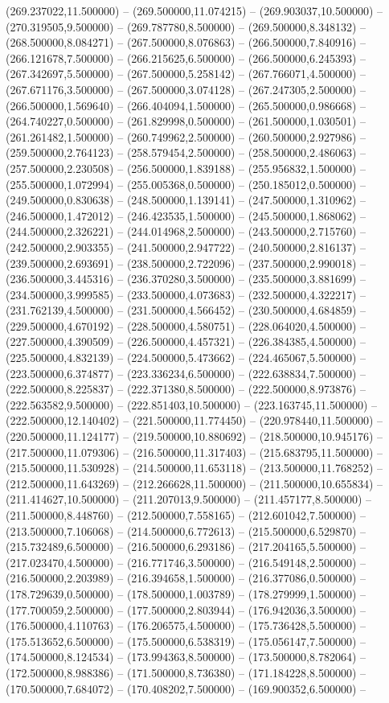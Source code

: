 (269.237022,11.500000) -- (269.500000,11.074215) -- (269.903037,10.500000) -- (270.319505,9.500000) -- (269.787780,8.500000) -- (269.500000,8.348132) -- (268.500000,8.084271) -- (267.500000,8.076863) -- (266.500000,7.840916) -- (266.121678,7.500000) -- (266.215625,6.500000) -- (266.500000,6.245393) -- (267.342697,5.500000) -- (267.500000,5.258142) -- (267.766071,4.500000) -- (267.671176,3.500000) -- (267.500000,3.074128) -- (267.247305,2.500000) -- (266.500000,1.569640) -- (266.404094,1.500000) -- (265.500000,0.986668) -- (264.740227,0.500000) -- (261.829998,0.500000) -- (261.500000,1.030501) -- (261.261482,1.500000) -- (260.749962,2.500000) -- (260.500000,2.927986) -- (259.500000,2.764123) -- (258.579454,2.500000) -- (258.500000,2.486063) -- (257.500000,2.230508) -- (256.500000,1.839188) -- (255.956832,1.500000) -- (255.500000,1.072994) -- (255.005368,0.500000) -- (250.185012,0.500000) -- (249.500000,0.830638) -- (248.500000,1.139141) -- (247.500000,1.310962) -- (246.500000,1.472012) -- (246.423535,1.500000) -- (245.500000,1.868062) -- (244.500000,2.326221) -- (244.014968,2.500000) -- (243.500000,2.715760) -- (242.500000,2.903355) -- (241.500000,2.947722) -- (240.500000,2.816137) -- (239.500000,2.693691) -- (238.500000,2.722096) -- (237.500000,2.990018) -- (236.500000,3.445316) -- (236.370280,3.500000) -- (235.500000,3.881699) -- (234.500000,3.999585) -- (233.500000,4.073683) -- (232.500000,4.322217) -- (231.762139,4.500000) -- (231.500000,4.566452) -- (230.500000,4.684859) -- (229.500000,4.670192) -- (228.500000,4.580751) -- (228.064020,4.500000) -- (227.500000,4.390509) -- (226.500000,4.457321) -- (226.384385,4.500000) -- (225.500000,4.832139) -- (224.500000,5.473662) -- (224.465067,5.500000) -- (223.500000,6.374877) -- (223.336234,6.500000) -- (222.638834,7.500000) -- (222.500000,8.225837) -- (222.371380,8.500000) -- (222.500000,8.973876) -- (222.563582,9.500000) -- (222.851403,10.500000) -- (223.163745,11.500000) -- (222.500000,12.140402) -- (221.500000,11.774450) -- (220.978440,11.500000) -- (220.500000,11.124177) -- (219.500000,10.880692) -- (218.500000,10.945176) -- (217.500000,11.079306) -- (216.500000,11.317403) -- (215.683795,11.500000) -- (215.500000,11.530928) -- (214.500000,11.653118) -- (213.500000,11.768252) -- (212.500000,11.643269) -- (212.266628,11.500000) -- (211.500000,10.655834) -- (211.414627,10.500000) -- (211.207013,9.500000) -- (211.457177,8.500000) -- (211.500000,8.448760) -- (212.500000,7.558165) -- (212.601042,7.500000) -- (213.500000,7.106068) -- (214.500000,6.772613) -- (215.500000,6.529870) -- (215.732489,6.500000) -- (216.500000,6.293186) -- (217.204165,5.500000) -- (217.023470,4.500000) -- (216.771746,3.500000) -- (216.549148,2.500000) -- (216.500000,2.203989) -- (216.394658,1.500000) -- (216.377086,0.500000) -- (178.729639,0.500000) -- (178.500000,1.003789) -- (178.279999,1.500000) -- (177.700059,2.500000) -- (177.500000,2.803944) -- (176.942036,3.500000) -- (176.500000,4.110763) -- (176.206575,4.500000) -- (175.736428,5.500000) -- (175.513652,6.500000) -- (175.500000,6.538319) -- (175.056147,7.500000) -- (174.500000,8.124534) -- (173.994363,8.500000) -- (173.500000,8.782064) -- (172.500000,8.988386) -- (171.500000,8.736380) -- (171.184228,8.500000) -- (170.500000,7.684072) -- (170.408202,7.500000) -- (169.900352,6.500000) -- 